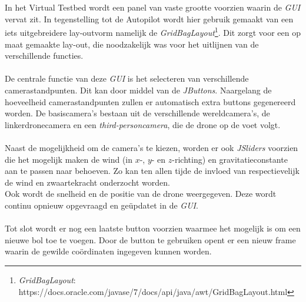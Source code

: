 \\
\\
In het Virtual Testbed wordt een panel van vaste grootte voorzien waarin de \textit{GUI} vervat zit. In tegenstelling tot de Autopilot wordt hier gebruik gemaakt van een iets uitgebreidere lay-outvorm namelijk de \textit{GridBagLayout}\footnote{\textit{GridBagLayout}: https://docs.oracle.com/javase/7/docs/api/java/awt/GridBagLayout.html}. Dit zorgt voor een op maat gemaakte lay-out, die noodzakelijk was voor het uitlijnen van de verschillende functies. 
\\
\\
De centrale functie van deze \textit{GUI} is het selecteren van verschillende camerastandpunten. Dit kan door middel van de \textit{JButtons}. Naargelang de hoeveelheid camerastandpunten zullen er automatisch extra buttons gegenereerd worden. De basiscamera's bestaan uit de verschillende wereldcamera's, de linkerdronecamera en een \textit{third-personcamera}, die de drone op de voet volgt.
\\
\\
Naast de mogelijkheid om de camera's te kiezen, worden er ook \textit{JSliders} voorzien die het mogelijk maken de wind (in \(x\)-, \(y\)- en \(z\)-richting) en gravitatieconstante aan te passen naar behoeven. Zo kan ten allen tijde de invloed van respectievelijk de wind en zwaartekracht onderzocht worden. 
\\
Ook wordt de snelheid en de positie van de drone weergegeven. Deze wordt continu opnieuw opgevraagd en ge\"{u}pdatet in de \textit{GUI}. 
\\
\\
Tot slot wordt er nog een laatste button voorzien waarmee het mogelijk is om een nieuwe bol toe te voegen. Door de button te gebruiken opent er een nieuw frame waarin de gewilde co\"ordinaten ingegeven kunnen worden. 
